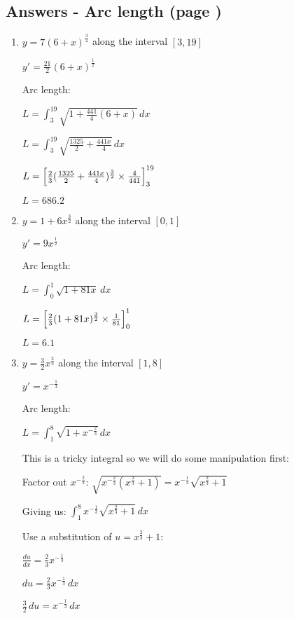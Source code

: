 \documentclass[../main.tex]{subfiles}
\begin{document}
\subsection*{Answers - Arc length (page \pageref{Arc length})}
\label{Arc length answers}
\begin{enumerate}[itemsep=0.7cm]
    \item 
    $y=7(6+x)^{\frac{3}{2}}$ along the interval $[3,19]$

    $y'=\frac{21}{2}(6+x)^{\frac{1}{2}}$

    Arc length:

    $L=\int_3^{19} \sqrt{1+\frac{441}{4}(6+x)}\,dx$

    $L=\int_3^{19} \sqrt{\frac{1325}{2}+\frac{441x}{4}}\,dx$

    $L=\Bigl[\frac{2}{3}(\frac{1325}{2}+\frac{441x}{4})^{\frac{3}{2}}\times \frac{4}{441}\Bigr]_3^{19}$

    $L=686.2$

    \item
    $y=1+6x^{\frac{3}{2}}$ along the interval $[0,1]$

    $y'=9x^{\frac{1}{2}}$

    Arc length:

    $L=\int_0^1 \sqrt{1+81x}\,dx$

    $L=\Bigl[\frac{2}{3}(1+81x)^{\frac{3}{2}}\times \frac{1}{81}\Bigr]_0^1$

    $L=6.1$

    \item 
    $y=\frac{3}{2}x^{\frac{2}{3}}$ along the interval $[1,8]$

    $y'=x^{-\frac{1}{3}}$

    Arc length:

    $L=\int_1^8 \sqrt{1+x^{-\frac{2}{3}}}\,dx$

    This is a tricky integral so we will do some manipulation first:

    Factor out $x^{-\frac{2}{3}}$: $\sqrt{x^{-\frac{2}{3}}(x^{\frac{2}{3}}+1)}=x^{-\frac{1}{3}}\sqrt{x^{\frac{2}{3}}+1}$

    Giving us: $\int_1^8 x^{-\frac{1}{3}}\sqrt{x^{\frac{2}{3}}+1}\,dx$

    Use a substitution of $u=x^{\frac{2}{3}}+1$:

    $\frac{du}{dx}=\frac{2}{3}x^{-\frac{1}{3}}$

    $du=\frac{2}{3}x^{-\frac{1}{3}}\,dx$

    $\frac{3}{2}\,du=x^{-\frac{1}{3}}\,dx$


\end{enumerate}
\end{document}
